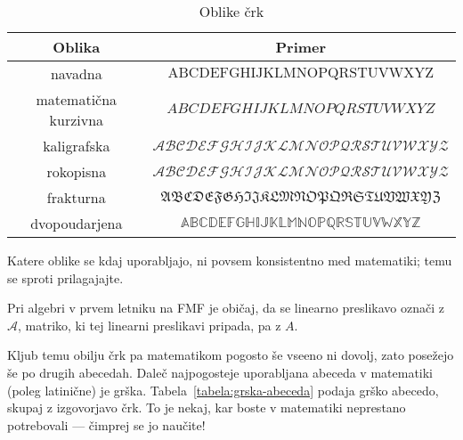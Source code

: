 \begin{table}[!ht]
\centering
\begin{tabular}{c|c}
\textbf{Oblika} & \textbf{Primer} \\
\hline
navadna & $\mathrm{ABCDEFGHIJKLMNOPQRSTUVWXYZ}$ \\
matematična kurzivna & $ABCDEFGHIJKLMNOPQRSTUVWXYZ$ \\
kaligrafska & $\mathcal{ABCDEFGHIJKLMNOPQRSTUVWXYZ}$ \\
rokopisna & $\mathscr{ABCDEFGHIJKLMNOPQRSTUVWXYZ}$ \\
frakturna & $\mathfrak{ABCDEFGHIJKLMNOPQRSTUVWXYZ}$ \\
dvopoudarjena & $\mathbb{ABCDEFGHIJKLMNOPQRSTUVWXYZ}$
\end{tabular}
\caption{Oblike črk}\label{tabela:oblike-crk}
\end{table}



Katere oblike se kdaj uporabljajo, ni povsem konsistentno med matematiki; temu se sproti prilagajajte.

\begin{zgled}
Pri algebri v prvem letniku na FMF je običaj, da se linearno preslikavo označi z $\mathcal{A}$, matriko, ki tej linearni preslikavi pripada, pa z $A$.
\end{zgled}

Kljub temu obilju črk pa matematikom pogosto še vseeno ni dovolj, zato posežejo še po drugih abecedah. Daleč najpogosteje uporabljana abeceda v matematiki (poleg latinične) je grška. Tabela~\ref{tabela:grska-abeceda} podaja grško abecedo, skupaj z izgovorjavo črk. To je nekaj, kar boste v matematiki neprestano potrebovali --- čimprej se jo naučite!

